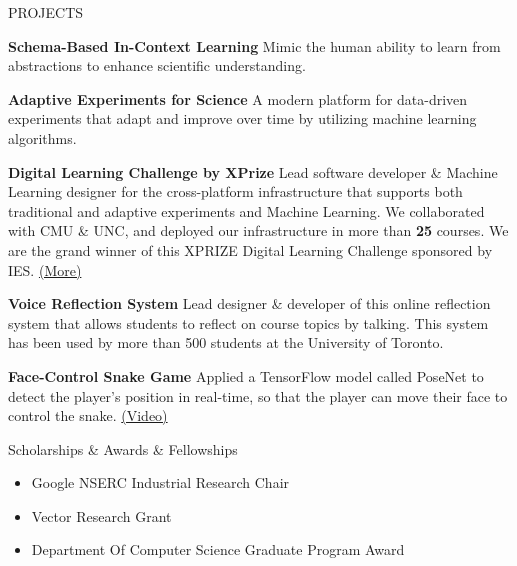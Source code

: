 \documentclass{resume} %
\begin{document}
\begin{rSection}{PROJECTS}
\vspace{-1.25em}
\item \textbf{Schema-Based In-Context Learning} {Mimic the human ability to learn from abstractions to enhance scientific understanding.}
\item \textbf{Adaptive Experiments for Science} {A modern platform for data-driven experiments that adapt and improve over time by utilizing machine learning algorithms.}

\item \textbf{Digital Learning Challenge by XPrize} {Lead software developer \& Machine Learning designer for the cross-platform infrastructure that supports both traditional and adaptive experiments and Machine Learning. We collaborated with CMU \& UNC, and deployed our infrastructure in more than \textbf{25} courses. We are the grand winner of this XPRIZE Digital Learning Challenge sponsored by IES. \href{https://www.xprize.org/challenge/digitallearning/finalist-teams}{(More)}}

\item \textbf{Voice Reflection System} {Lead designer \& developer of this online reflection system that allows students to reflect on course topics by talking. This system has been used by more than 500 students at the University of Toronto.}

\item \textbf{Face-Control Snake Game} {Applied a TensorFlow model called PoseNet to detect the player's position in real-time, so that the player can move their face to control the snake. \href{https://www.youtube.com/watch?v=Zn_5Oy7DZJw}{(Video)}}
\end{rSection} 

\begin{rSection}{Scholarships \& Awards \& Fellowships}
    \begin{itemize}
    \item Google NSERC Industrial Research Chair
    \item Vector Research Grant
    \item Department Of Computer Science Graduate Program Award
    \end{itemize}
\end{rSection}
\end{document}
